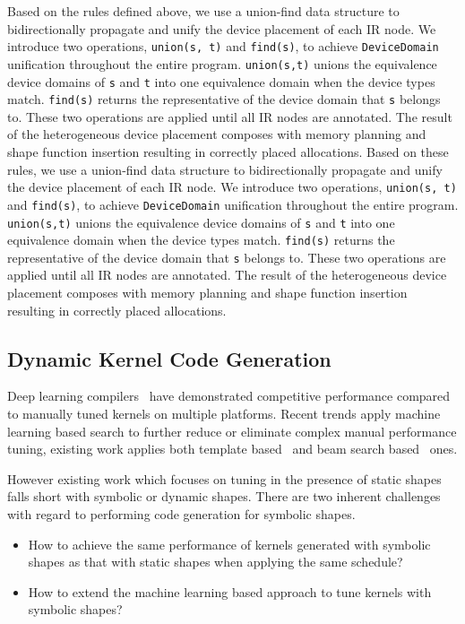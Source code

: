Based on the rules defined above, we use a union-find data structure to bidirectionally
  propagate and unify the device placement of each IR node.
We introduce two operations, \texttt{union(s, t)} and \texttt{find(s)},
  to achieve \texttt{DeviceDomain} unification throughout the entire program.
\texttt{union(s,t)} unions the equivalence device domains of \texttt{s} and \texttt{t}
  into one equivalence domain when the device types match.
\texttt{find(s)} returns the representative of the device domain
  that \texttt{s} belongs to.
These two operations are applied until all IR nodes are annotated.
The result of the heterogeneous device placement composes with memory planning
  and shape function insertion resulting in correctly placed allocations.
Based on these rules, we use a union-find data structure to
  bidirectionally propagate and unify the device placement of each IR node.
We introduce two operations, \texttt{union(s, t)} and \texttt{find(s)},
  to achieve \texttt{DeviceDomain} unification throughout the entire program.
\texttt{union(s,t)} unions the equivalence device domains of \texttt{s}
  and \texttt{t} into one equivalence domain when the device types match.
\texttt{find(s)} returns the representative of the device domain that \texttt{s} belongs to.
These two operations are applied until all IR nodes are annotated.
The result of the heterogeneous device placement composes with memory planning and shape function insertion resulting in
correctly placed allocations.

\subsection{Dynamic Kernel Code Generation}
\label{sec:compliation:codegen}
Deep learning compilers~\citep{tvm_osdi18, halide} have demonstrated competitive performance compared to manually
  tuned kernels on multiple platforms.
Recent trends apply machine learning based search to further reduce or eliminate complex manual performance tuning,
  existing work applies both template based~\citep{chen2018learning, zheng2020flextensor} and beam search based~\citep{adams2019learning} ones.

However existing work which focuses on tuning in the presence of static shapes falls short with symbolic or dynamic shapes.
There are two inherent challenges with regard to performing code generation for symbolic shapes.
\begin{itemize}
    \item How to achieve the same performance of kernels generated with symbolic shapes as that with static shapes when applying the same schedule?
    \item How to extend the machine learning based approach to tune kernels with symbolic shapes?
\end{itemize}

